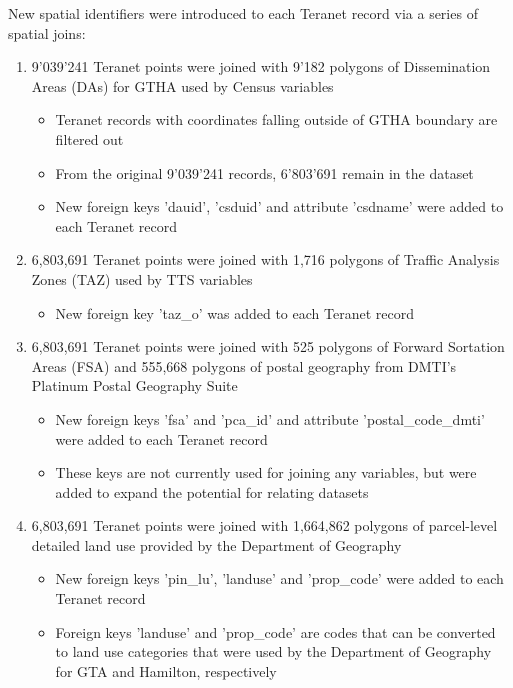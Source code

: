 \vspace{5mm}

New spatial identifiers were introduced to each Teranet record via a series of spatial joins:
\begin{enumerate}
    \item 9'039'241 Teranet points were joined with 9'182 polygons of Dissemination Areas (DAs) for GTHA used by Census variables
    \begin{itemize}
        \item Teranet records with coordinates falling outside of GTHA boundary are filtered out
        \item From the original 9'039'241 records, 6'803'691 remain in the dataset
        \item New foreign keys 'dauid', 'csduid' and attribute 'csdname' were added to each Teranet record
    \end{itemize}
    \item 6,803,691 Teranet points were joined with 1,716 polygons of Traffic Analysis Zones (TAZ) used by TTS variables
    \begin{itemize}
        \item New foreign key 'taz\_o' was added to each Teranet record
    \end{itemize}
    \item 6,803,691 Teranet points were joined with 525 polygons of Forward Sortation Areas (FSA) and 555,668 polygons of postal geography from DMTI's Platinum Postal Geography Suite
    \begin{itemize}
        \item New foreign keys 'fsa' and 'pca\_id' and attribute 'postal\_code\_dmti' were added to each Teranet record
        \item These keys are not currently used for joining any variables, but were added to expand the potential for relating datasets
    \end{itemize}
    \item 6,803,691 Teranet points were joined with 1,664,862 polygons of parcel-level detailed land use provided by the Department of Geography
    \begin{itemize}
        \item New foreign keys 'pin\_lu', 'landuse' and 'prop\_code' were added to each Teranet record
        \item Foreign keys 'landuse' and 'prop\_code' are codes that can be converted to land use categories that were used by the Department of Geography for GTA and Hamilton, respectively

\end{itemize}
\end{enumerate}
